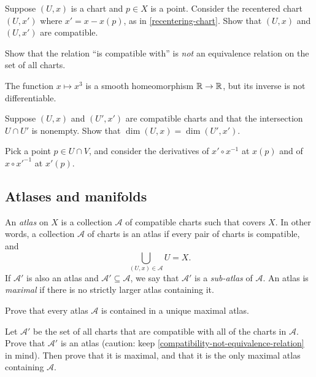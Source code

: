 \begin{exercise}
	Suppose $(U, x)$ is a chart and $p \in X$ is a point. Consider the recentered chart $(U, x')$ where $x' = x - x(p)$, as in \cref{recentering-chart}. Show that $(U, x)$ and $(U, x')$ are compatible. 
\end{exercise}

\begin{exercise} \label{compatibility-not-equivalence-relation}
	Show that the relation ``is compatible with'' is \emph{not} an equivalence relation on the set of all charts. 
	\begin{hint}
		The function $x \mapsto x^3$ is a smooth homeomorphism $\mathbb{R} \to \mathbb{R}$, but its inverse is not differentiable. 
	\end{hint}
\end{exercise}

\begin{exercise} \label{dimension-well-defined}
	Suppose $(U, x)$ and $(U', x')$ are compatible charts and that the intersection $U \cap U'$ is nonempty. Show that $\dim(U,x) = \dim(U',x')$. 
	\begin{hint}
		Pick a point $p \in U \cap V$, and consider the derivatives of $x' \circ x^{-1}$ at $x(p)$ and of $x \circ x'^{-1}$ at $x'(p)$. 
	\end{hint}
\end{exercise}

\subsection{Atlases and manifolds}

\begin{definition}[Atlas]   
	An \emph{atlas} on $X$ is a collection $\mathscr{A}$ of compatible charts such that covers $X$. In other words, a collection $\mathscr{A}$ of charts is an atlas if every pair of charts is compatible, and \[ \bigcup_{(U, x) \in \mathscr{A}} U = X. \]
	If $\mathscr{A}'$ is also an atlas and $\mathscr{A}' \subseteq \mathscr{A}$, we say that $\mathscr{A}'$ is a \emph{sub-atlas} of $\mathscr{A}$. An atlas is \emph{maximal} if there is no strictly larger atlas containing it.
\end{definition}

\begin{exercise} \label{existence-maximal-atlas}
	Prove that every atlas $\mathscr{A}$ is contained in a unique maximal atlas. 
	\begin{hint}
		Let $\mathscr{A}'$ be the set of all charts that are compatible with all of the charts in $\mathscr{A}$. Prove that $\mathscr{A}'$ is an atlas (caution: keep \cref{compatibility-not-equivalence-relation} in mind). Then prove that it is maximal, and that it is the only maximal atlas containing $\mathscr{A}$. 
	\end{hint}
\end{exercise}

